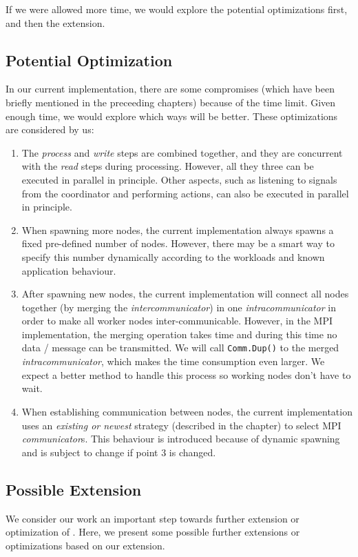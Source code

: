 If we were allowed more time, we would explore the potential optimizations first, and then the extension.

\subsection{Potential Optimization}
In our current implementation, there are some compromises (which have been briefly mentioned in the preceeding chapters) because of the time limit. Given enough time, we would explore which ways will be better. These optimizations are considered by us:

\begin{enumerate}
	\item The \emph{process} and \emph{write} steps are combined together, and they are concurrent with the \emph{read} steps during processing. However, all they three can be executed in parallel in principle. Other aspects, such as listening to signals from the coordinator and performing actions, can also be executed in parallel in principle.
	\item When spawning more nodes, the current implementation always spawns a fixed pre-defined number of nodes. However, there may be a smart way to specify this number dynamically according to the workloads and known application behaviour.
	\item After spawning new nodes, the current implementation will connect all nodes together (by merging the \emph{intercommunicator}) in one \emph{intracommunicator} in order to make all worker nodes inter-communicable. However, in the MPI implementation, the merging operation takes time and during this time no data / message can be transmitted. We will call \lstinline|Comm.Dup()| to the merged \emph{intracommunicator}, which makes the time consumption even larger. We expect a better method to handle this process so working nodes don't have to wait.
	\item When establishing communication between nodes, the current implementation uses an \emph{existing or newest} strategy (described in the \tIncDep chapter) to select MPI \emph{communicator}s. This behaviour is introduced because of dynamic spawning and is subject to change if point 3 is changed.
\end{enumerate}

\subsection{Possible Extension}
We consider our work an important step towards further extension or optimization of \dpy. Here, we present some possible further extensions or optimizations based on our extension. \\

